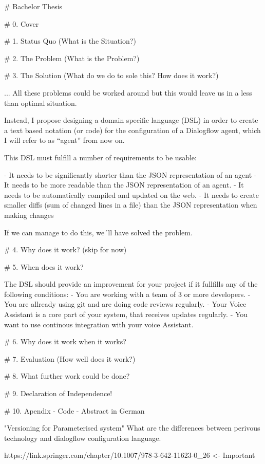 # Bachelor Thesis

# 0. Cover

# 1. Status Quo (What is the Situation?)

# 2. The Problem (What is the Problem?)

# 3. The Solution (What do we do to sole this? How does it work?)

... All these problems could be worked around but this would leave us in a less than optimal situation.

Instead, I propose designing a domain specific language (DSL) in order to create a text based notation (or code) for the configuration of a Dialogflow agent, which I will refer to as “agent” from now on.

This DSL must fulfill a number of requirements to be usable:

- It needs to be significantly shorter than the JSON representation of an agent
- It needs to be more readable than the JSON representation of an agent.
- It needs to be automatically compiled and updated on the web.
- It needs to create smaller diffs (sum of changed lines in a file) than the JSON representation when making changes

If we can manage to do this, we´ll have solved the problem.

# 4. Why does it work? (skip for now)

# 5. When does it work?

The DSL should provide an improvement for your project if it fullfills any of the following conditions:
- You are working with a team of 3 or more developers.
- You are allready using git and are doing code reviews regularly.
- Your Voice Assistant is a core part of your system, that receives updates regularly. 
- You want to use continous integration with your voice Assistant.

# 6. Why does it work when it works?

# 7. Evaluation (How well does it work?)

# 8. What further work could be done?

# 9. Declaration of Independence!

# 10. Apendix
 - Code
 - Abstract in German


"Versioning for Parameterised system"
What are the differences between perivous technology and dialogflow configuration language.

https://link.springer.com/chapter/10.1007/978-3-642-11623-0_26 <- Important

